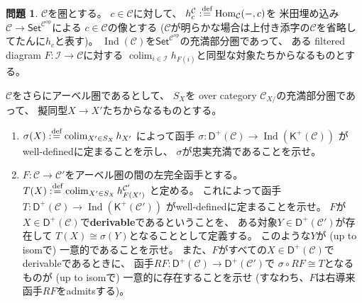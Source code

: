 \documentclass[uplatex,dvipdfmx]{jsarticle}
\theoremstyle{definition}
\newtheorem{prob}[prob]{問題}
\DeclareMathOperator{\Hom}{\mathrm{Hom}}
\newcommand{\op}{\mathrm{op}}
\DeclareMathOperator{\colim}{\mathrm{colim}}
\DeclareMathOperator{\Ind}{\mathrm{Ind}}
\newcommand{\sfK}{\mathsf{K}}
\newcommand{\sfD}{\mathsf{D}}
\newcommand\sfSet{\mathsf{Set}}
\newcommand\mcC{\mathcal{C}}
\newcommand\mcI{\mathcal{I}}
\def\dfn{:\overset{\mbox{{\scriptsize def}}}{=}}
\begin{document}
\begin{prob}\label{1.15}
  \(\mcC\)を圏とする。
  \(c\in \mcC\)に対して、
  \(h_c^{\mcC} \dfn \Hom_{\mcC}(-,c)\)を
  米田埋め込み\(\mcC\to \sfSet^{\mcC^{\op}}\)による
  \(c\in \mcC\)の像とする
  (\(\mcC\)が明らかな場合は上付き添字の\(\mcC\)を省略してたんに\(h_c\)と表す)。
  \(\Ind(\mcC)\)を\(\sfSet^{\mcC^{\op}}\)の充満部分圏であって、
  ある filtered diagram \(F:\mcI\to \mcC\)に対する
  \(\colim_{i\in \mcI} h_{F(i)}\)と同型な対象たちからなるものとする。

  \(\mcC\)をさらにアーベル圏であるとして、
  \(S_X\)を over category \(\mcC_{X/}\)の充満部分圏であって、
  擬同型\(X\to X'\)たちからなるものとする。
  \begin{enumerate}
    \item \label{1.15.1}
    \(\sigma(X) \dfn \colim_{X'\in S_X}h_{X'}\)
    によって函手
    \(\sigma:\sfD^+(\mcC)\to \Ind(\sfK^+(\mcC))\)
    がwell-definedに定まることを示し、
    \(\sigma\)が忠実充満であることを示せ。
    \item \label{1.15.2}
    \(F:\mcC\to \mcC'\)をアーベル圏の間の左完全函手とする。
    \(T(X)\dfn \colim_{X'\in S_X}h_{F(X')}^{\mcC'}\)
    と定める。
    これによって函手\(T:\sfD^+(\mcC)\to \Ind(\sfK^+(\mcC'))\)
    がwell-definedに定まることを示せ。
    \(F\)が\(X\in \sfD^+(\mcC)\)で\textbf{derivable}であるということを、
    ある対象\(Y\in \sfD^+(\mcC')\)が存在して
    \(T(X) \cong \sigma(Y)\)となることとして定義する。
    このような\(Y\)が (up to isomで) 一意的であることを示せ。
    また、\(F\)がすべての\(X\in \sfD^+(\mcC)\)でderivableであるときに、
    函手\(RF:\sfD^+(\mcC)\to \sfD^+(\mcC')\)で
    \(\sigma\circ RF \cong T\)となるものが (up to isomで) 一意的に存在することを示せ
    (すなわち、\(F\)は右導来函手\(RF\)をadmitsする)。
  \end{enumerate}
\end{prob}
\end{document}
